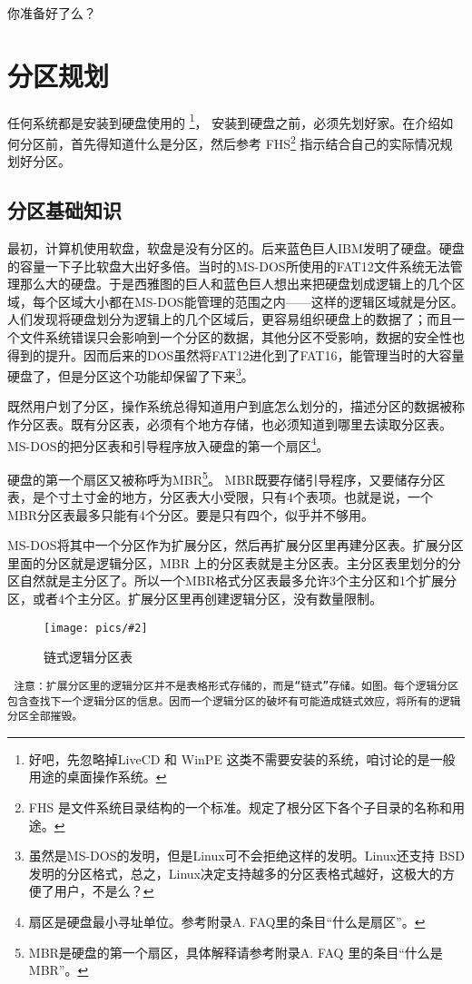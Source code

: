 \documentclass[amstex]{ctexbook}
\newenvironment{notice}{\tt}{}
\newcommand{\chatu}[3][0.35]{%
\begin{figure}[h]%
\centering%
\texttt{[image: pics/\#2]}%
\caption{#3\label{fig:#2}}%
\end{figure}%
}
\begin{document}
你准备好了么？

\section{分区规划}
任何系统都是安装到硬盘使用的
\footnote{好吧，先忽略掉LiveCD 和  WinPE 这类不需要安装的系统，咱讨论的是一般用途的桌面操作系统。}，
安装到硬盘之前，必须先划好家。在介绍如何分区前，首先得知道什么是分区，然后参考
FHS\footnote{FHS 是文件系统目录结构的一个标准。规定了根分区下各个子目录的名称和用途。}
指示结合自己的实际情况规划好分区。

\subsection{分区基础知识}
最初，计算机使用软盘，软盘是没有分区的。后来蓝色巨人IBM发明了硬盘。硬盘的容量一下子比软盘大出好多倍。当时的MS-DOS所使用的FAT12文件系统无法管理那么大的硬盘。于是西雅图的巨人和蓝色巨人想出来把硬盘划成逻辑上的几个区域，每个区域大小都在MS-DOS能管理的范围之内——这样的逻辑区域就是分区。人们发现将硬盘划分为逻辑上的几个区域后，更容易组织硬盘上的数据了；而且一个文件系统错误只会影响到一个分区的数据，其他分区不受影响，数据的安全性也得到的提升。因而后来的DOS虽然将FAT12进化到了FAT16，能管理当时的大容量硬盘了，但是分区这个功能却保留了下来\footnote{虽然是MS-DOS的发明，但是Linux可不会拒绝这样的发明。Linux还支持 BSD 发明的分区格式，总之，Linux决定支持越多的分区表格式越好，这极大的方便了用户，不是么？}。

既然用户划了分区，操作系统总得知道用户到底怎么划分的，描述分区的数据被称作分区表。既有分区表，必须有个地方存储，也必须知道到哪里去读取分区表。MS-DOS的把分区表和引导程序放入硬盘的第一个扇区\footnote{扇区是硬盘最小寻址单位。参考附录A. FAQ里的条目“什么是扇区”。}。

硬盘的第一个扇区又被称呼为MBR\footnote{MBR是硬盘的第一个扇区，具体解释请参考附录A. FAQ 里的条目“什么是 MBR”。}。
MBR既要存储引导程序，又要储存分区表，是个寸土寸金的地方，分区表大小受限，只有4个表项。也就是说，一个 MBR分区表最多只能有4个分区。要是只有四个，似乎并不够用。

MS-DOS将其中一个分区作为扩展分区，然后再扩展分区里再建分区表。扩展分区里面的分区就是逻辑分区，MBR 上的分区表就是主分区表。主分区表里划分的分区自然就是主分区了。所以一个MBR格式分区表最多允许3个主分区和1个扩展分区，或者4个主分区。扩展分区里再创建逻辑分区，没有数量限制。
\chatu{logicalpart}{链式逻辑分区表}

\begin{notice}
注意：扩展分区里的逻辑分区并不是表格形式存储的，而是“链式”存储。如图。每个逻辑分区包含查找下一个逻辑分区的信息。因而一个逻辑分区的破坏有可能造成链式效应，将所有的逻辑分区全部摧毁。
\end{notice}
\end{document}
